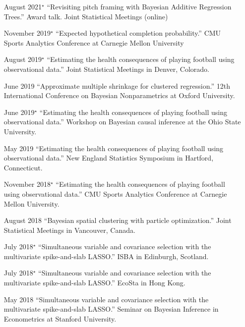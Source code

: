 \documentclass[margin]{res}
\begin{document}
\begin{resume}
\begin{itemize}
\item[August 2021$^{\star}$]{``Revisiting pitch framing with Bayesian Additive Regression Trees.'' Award talk. Joint Statistical Meetings (online)}

\item[November 2019$^{\star}$]{``Expected hypothetical completion probability.'' CMU Sports Analytics Conference at Carnegie Mellon University}

\item[August 2019$^{\star}$]{``Estimating the health consequences of playing football using observational data.'' Joint Statistical Meetings in Denver, Colorado.}

\item[June 2019]{``Approximate multiple shrinkage for clustered regression.'' 12th International Conference on Bayesian Nonparametrics at Oxford University.}

\item[June 2019$^{\star}$]{``Estimating the health consequences of playing football using observational data.'' Workshop on Bayesian causal inference at the Ohio State University.}

\item[May 2019]{``Estimating the health consequences of playing football using observational data.'' New England Statistics Symposium in Hartford, Connecticut.}

\item[November 2018$^{\star}$]{``Estimating the health consequences of playing football using observational data.'' CMU Sports Analytics Conference at Carnegie Mellon University.}

\item[August 2018]{``Bayesian spatial clustering with particle optimization.'' Joint Statistical Meetings in Vancouver, Canada.}

\item[July 2018$^{\star}$]{``Simultaneous variable and covariance selection with the multivariate spike-and-slab LASSO.'' ISBA in Edinburgh, Scotland.}

\item[July 2018$^{\star}$]{``Simultaneous variable and covariance selection with the multivariate spike-and-slab LASSO.'' EcoSta in Hong Kong.}

\item[May 2018]{``Simultaneous variable and covariance selection with the multivariate spike-and-slab LASSO.'' Seminar on Bayesian Inference in Econometrics at Stanford University.}


\end{itemize}
\end{resume}
\end{document}
